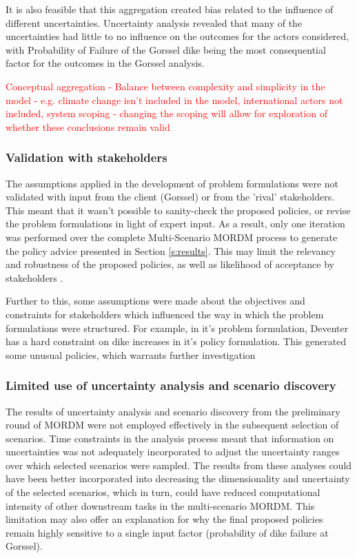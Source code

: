 It is also feasible that this aggregation created bias related to the influence of different uncertainties. Uncertainty analysis revealed that many of the uncertainties had little to no influence on the outcomes for the actors considered, with Probability of Failure of the Gorssel dike being the most consequential factor for the outcomes in the Gorssel analysis.

\textcolor{red}{Conceptual aggregation - Balance between complexity and simplicity in the model - e.g. climate change isn't included in the model, international actors not included, system scoping - changing the scoping will allow for exploration of whether these conclusions remain valid}

\subsubsection{Validation with stakeholders}
The assumptions applied in the development of problem formulations were not validated with input from the client (Gorssel) or from the 'rival' stakeholders. This meant that it wasn't possible to sanity-check the proposed policies, or revise the problem formulations in light of expert input. As a result, only one iteration was performed over the complete Multi-Scenario MORDM process to generate the policy advice presented in Section \ref{s:results}. This may limit the relevancy and robustness of the proposed policies, as well as likelihood of acceptance by stakeholders \parencite{quinn_rival_2017}.

Further to this, some assumptions were made about the objectives and constraints for stakeholders which influenced the way in which the problem formulations were structured. For example, in it's problem formulation, Deventer has a hard constraint on dike increases in it's policy formulation. This generated some unusual policies, which warrants further investigation

\subsubsection{Limited use of uncertainty analysis and scenario discovery}
The results of uncertainty analysis and scenario discovery from the preliminary round of MORDM were not employed effectively in the subsequent selection of scenarios. Time constraints in the analysis process meant that information on uncertainties was not adequately incorporated to adjust the uncertainty ranges over which selected scenarios were sampled. The results from these analyses could have been better incorporated into decreasing the dimensionality and uncertainty of the selected scenarios, which in turn, could have reduced computational intensity of other downstream tasks in the multi-scenario MORDM. This limitation may also offer an explanation for why the final proposed policies remain highly sensitive to a single input factor (probability of dike failure at Gorssel).

